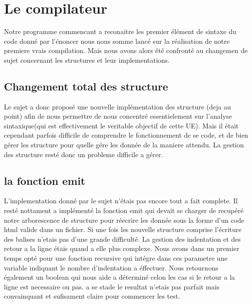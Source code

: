 \documentclass[12pt]{article}
\begin{document}
\newpage

\section{Le compilateur}

Notre programme commencant a reconaitre les premier élément de sintaxe
du code donné par l'énoncer nous nous somme lancé sur la réalisation de notre
premiere vrais compilation.
\newline
\newline
Mais nous avons alors été confronté au changemen de sujet concernant les structures
et leur implementations.

\subsection{Changement total des structure}

Le sujet a donc proposé une nouvelle implémentation des structure (deja au point) afin de nous
permettre de nous concentré essentielement sur l'analyse sintaxique(qui est effectivement
le veritable objectif de cette UE). Mais il était cependant parfois difficile de comprendre
le fonctionnement de se code, et de bien gérer les structure pour quelle gére les donnée
de la maniere attendu. La gestion des structure resté donc un probleme difficile
a gérer.

\subsection{la fonction emit}

L'implementation donné par le sujet n'étais pas encore tout a fait complete.
Il resté nottament a implémenté la fonction emit qui devait se charger de recupéré
notre arborescence de structure pour réecrire les donnée sous la forme d'un code
html valide dans un fichier.
\newline
\newline
Si une fois les nouvelle structure comprise l'écriture des balises n'etais pas
d'une grande difficulté. La gestion des indentation et des retour a la ligne
étais quand a elle plus complexe. Nous avons dans un premier temps opté pour
une fonction recursive qui intégre dans ces parametre une variable indiquant
le nombre d'indentation a éffectuer. Nous retournons également un boolean qui
nous aide a déterminé celon les cas si le retour a la ligne est necessaire ou pas.
\newline
a se stade le resultat n'etais pas parfait mais convainquant et sufisament claire
pour commencer les test.
\end{document}
